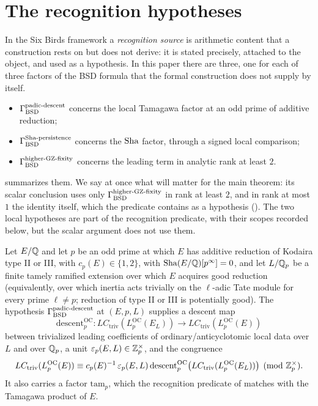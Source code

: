 \section{The recognition hypotheses}
\label{sec:recognition-sources}

In the Six Birds framework a \emph{recognition source} is arithmetic
content that a construction rests on but does not derive: it is stated
precisely, attached to the object, and used as a hypothesis.  In this
paper there are three, one for each of three factors of the BSD formula
that the formal construction does not supply by itself.
\begin{itemize}
\item $\Gamma_{\mathrm{BSD}}^{\mathrm{padic\text{-}descent}}$ concerns the local Tamagawa factor at an odd prime of
  additive reduction;
\item $\Gamma_{\mathrm{BSD}}^{\mathrm{Sha\text{-}persistence}}$ concerns the $\operatorname{Sha}$ factor, through a signed local
  comparison;
\item $\Gamma_{\mathrm{BSD}}^{\mathrm{higher\text{-}GZ\text{-}fixity}}$ concerns the leading term in analytic rank at least $2$.
\end{itemize}
 summarizes them.  We say at once what will
matter for the main theorem: its scalar conclusion uses only $\Gamma_{\mathrm{BSD}}^{\mathrm{higher\text{-}GZ\text{-}fixity}}$ in
rank at least $2$, and in rank at most $1$ the identity itself,
which the predicate contains as a hypothesis
().  The two local hypotheses are part of the
recognition predicate, with their scopes recorded below, but the scalar
argument does not use them.


\begin{definition}\label{def:closure:gamma-padic-descent}
Let $E/\mathbb{Q}$ and let $p$ be an odd prime at which $E$ has additive
reduction of Kodaira type II or III, with $c_p(E)\in\{1,2\}$, with
$\operatorname{Sha}(E/\mathbb{Q})[p^\infty]=0$, and let $L/\mathbb{Q}_p$ be a finite tamely ramified
extension over which $E$ acquires good reduction (equivalently, over
which inertia acts trivially on the $\ell$-adic Tate module for every
prime $\ell\neq p$; reduction of type II or III is potentially good).  The hypothesis
$\Gamma_{\mathrm{BSD}}^{\mathrm{padic\text{-}descent}}$ at $(E,p,L)$ supplies a descent map
\[
  \mathrm{descent}_p^{\mathrm{OC}}:
  LC_{\mathrm{triv}}(L_p^{\mathrm{OC}}(E_L))
  \longrightarrow
  LC_{\mathrm{triv}}(L_p^{\mathrm{OC}}(E))
\]
between trivialized leading coefficients of ordinary/anticyclotomic local
data over $L$ and over $\mathbb{Q}_p$, a unit $\varepsilon_p(E,L)\in\mathbb{Z}_p^\times$, and
the congruence
\[
  LC_{\mathrm{triv}}(L_p^{\mathrm{OC}}(E)) \equiv
  c_p(E)^{-1}\,\varepsilon_p(E,L)\,
  \mathrm{descent}_p^{\mathrm{OC}}
    \bigl(LC_{\mathrm{triv}}(L_p^{\mathrm{OC}}(E_L))\bigr)
  \pmod{\mathbb{Z}_p^\times}.
\]
It also carries a factor $\mathrm{tam}_p$, which the recognition predicate
of  matches with the Tamagawa product of $E$.
\end{definition}

